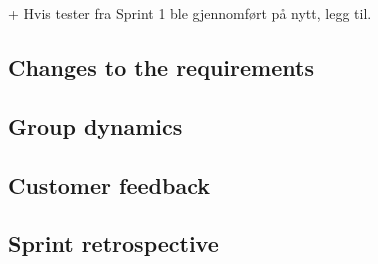 	+ Hvis tester fra Sprint 1 ble gjennomført på nytt, legg til.

\subsection{Changes to the requirements}

\subsection{Group dynamics}

\subsection{Customer feedback}

\subsection{Sprint retrospective}
	\subsubsection*{}
	\subsubsection*{}
	\subsubsection*{}
	\subsubsection*{}

